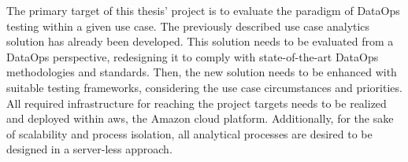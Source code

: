 The primary target of this thesis' project is to evaluate the paradigm of DataOps testing within a given use case. The previously described use case analytics solution has already been developed. This solution needs to be evaluated from a DataOps perspective, redesigning it to comply with state-of-the-art DataOps methodologies and standards. Then, the new solution needs to be enhanced with suitable testing frameworks, considering the use case circumstances and priorities. All required infrastructure for reaching the project targets needs to be realized and deployed within \ac{aws}, the Amazon cloud platform. Additionally, for the sake of scalability and process isolation, all analytical processes are desired to be designed in a server-less approach.